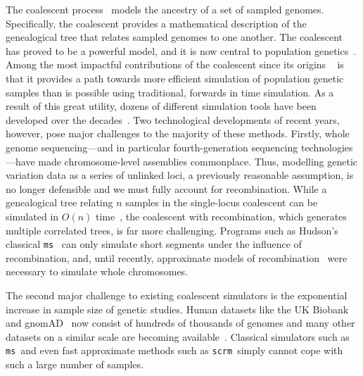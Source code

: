\documentclass{article}
\newcommand{\ms}[0]{\texttt{ms}}
\newcommand{\scrm}[0]{\texttt{scrm}}
\begin{document}
The coalescent
process~\citep{kingman1982coalescent,hudson1983testing,tajima1983evolutionary}
models the ancestry of a set of sampled genomes. Specifically,
the coalescent provides a mathematical description of the
genealogical tree that relates sampled genomes to one another.
The coalescent has proved to be a powerful model,
and it is now central to
population genetics~\citep{hudson1990gene,hein2004gene,wakely2008coalescent}.
Among the most impactful contributions of the coalescent since its origins
~\citep{hudson1983testing} is that it provides a path towards more efficient
simulation of population genetic samples than is possible using traditional,
forwards in time simulation.
As a result of this great utility, dozens of different simulation tools have been
developed over the decades~\citep{carvajal2008simulation,liu2008survey,
arenas2012simulation,yuan2012overview,hoban2012computer,yang2014critical,
peng2015genetic}.
Two technological developments of recent years, however,
pose major challenges to the majority of these methods.
Firstly, whole genome sequencing---and in particular fourth-generation
sequencing technologies---have made chromosome-level assemblies
commonplace. Thus, modelling genetic variation data as a series of unlinked loci,
a previously reasonable assumption, is no longer defensible and
we must fully account for recombination.
While a genealogical tree relating $n$ samples in the single-locus coalescent
can be simulated in $O(n)$ time~\citep{hudson1990gene},
the coalescent with recombination, which generates multiple correlated trees, is
far more challenging.
Programs such as Hudson's classical \ms~\citep{hudson2002generating}
can only simulate short segments under the influence of recombination,
and, until recently, approximate models of
recombination~\citep{mcvean2005approximating,staab2015scrm}
were necessary to simulate whole chromosomes.

The second major challenge to existing coalescent simulators is the
exponential increase in sample size of genetic studies. Human datasets like the
UK Biobank~\citep{bycroft2018genome} and
gnomAD~\citep{karczewski2020mutational} now consist of hundreds of
thousands of genomes and many other datasets on a similar scale
are becoming available~\citep{tanjo2021practical}.
Classical simulators such as \ms\ and even fast approximate methods
such as \scrm\ simply cannot cope with such a large number of samples.
\end{document}

